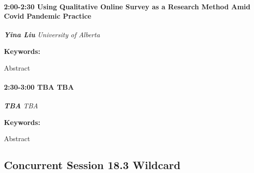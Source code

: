 \documentclass[
]{book}
\begin{document}
\begin{session}
\hypertarget{using-qualitative-online-survey-as-a-research-method-amid-covid-pandemic-practice}{%
\paragraph*{\texorpdfstring{2:00-2:30 \textbar{} \textbf{Using
Qualitative Online Survey as a Research Method Amid Covid Pandemic}
\textbar{}
Practice}{2:00-2:30 \textbar{} Using Qualitative Online Survey as a Research Method Amid Covid Pandemic \textbar{} Practice}}\label{using-qualitative-online-survey-as-a-research-method-amid-covid-pandemic-practice}}

\textbf{\emph{Yina Liu}} \textbar{} \emph{University of Alberta}

\textbf{Keywords:}

Abstract
\end{session}

\begin{session}
\hypertarget{tba-tba}{%
\paragraph*{\texorpdfstring{2:30-3:00 \textbar{} \textbf{TBA} \textbar{}
TBA}{2:30-3:00 \textbar{} TBA \textbar{} TBA}}\label{tba-tba}}

\textbf{\emph{TBA}} \textbar{} \emph{TBA}

\textbf{Keywords:}

Abstract
\end{session}

\hypertarget{concurrent-session-18.3-wildcard}{%
\subsection*{Concurrent Session 18.3 \textbar{} Wildcard}\label{concurrent-session-18.3-wildcard}}
\end{document}
